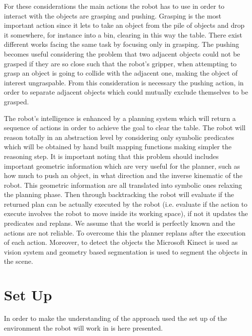 For these considerations the main actions the robot has to use in order to interact with the objects are grasping and pushing.
Grasping is the most important action since it lets to take an object from the pile of objects and drop it somewhere, for instance into a bin, clearing in this way the table. There exist different works facing the same task by focusing only in grasping. The pushing becomes useful considering the problem that two adjacent objects could not be grasped if they are so close such that the robot's gripper, when attempting to grasp an object is going to collide with the adjacent one, making the object of interest ungraspable. From this consideration is necessary the pushing action, in order to separate adjacent objects which could mutually exclude themselves to be grasped. 

The robot's intelligence is enhanced by a planning system  which will return a sequence of actions in order to achieve the goal to clear the table. 
The robot will reason totally in an abstraction level by considering only symbolic predicates which will be obtained by hand built mapping functions making simpler the reasoning step. It is important noting that this problem should includes important geometric information which are very useful for the planner, such as how much to push an object, in what direction and the inverse kinematic of the robot. This geometric information are all translated into symbolic ones relaxing the planning phase. Then through backtracking the robot will evaluate if the returned plan can be actually executed by the robot (i.e. evaluate if the action to execute involves the robot to move inside its working space), if not it updates the predicates and replans. 
We assume that the world is perfectly known and the actions are not reliable. To overcome this the planner replans after the execution of each action.  
Moreover, to detect the objects the Microsoft Kinect is used as vision system and geometry based segmentation is used to segment the objects in the scene.

\section{Set Up}
In order to make the understanding of the approach used  the set up of the environment the robot will work in is here presented. 

